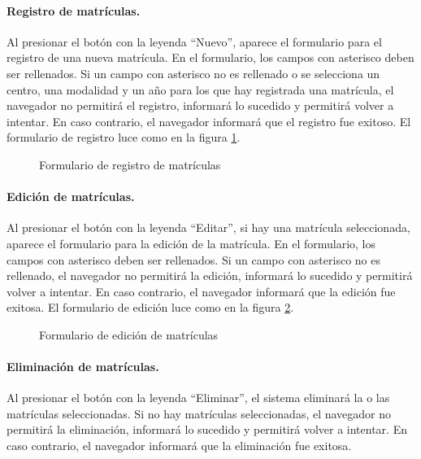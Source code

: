 \documentclass[a4paper, 9pt, conference]{article}              %
\begin{document}
\paragraph{Registro de matr\'iculas.}

Al presionar el bot\'on con la leyenda ``Nuevo'', aparece el formulario para el registro de una nueva matr\'icula. En el formulario, los campos con asterisco deben ser rellenados. Si un campo con asterisco no es rellenado o se selecciona un centro, una modalidad y un a\~no para los que hay registrada una matr\'icula, el navegador no permitir\'a el registro, informar\'a lo sucedido y permitir\'a volver a intentar. En caso contrario, el navegador informar\'a que el registro fue exitoso. El formulario de registro luce como en la figura \ref{fig:geoenrollmentsnew}.

\begin{figure}
	\centering
		\caption{Formulario de registro de matr\'iculas}
	\label{fig:geoenrollmentsnew}
\end{figure}

\paragraph{Edici\'on de matr\'iculas.}

Al presionar el bot\'on con la leyenda ``Editar'', si hay una matr\'icula seleccionada, aparece el formulario para la edici\'on de la matr\'icula. En el formulario, los campos con asterisco deben ser rellenados. Si un campo con asterisco no es rellenado, el navegador no permitir\'a la edici\'on, informar\'a lo sucedido y permitir\'a volver a intentar. En caso contrario, el navegador informar\'a que la edici\'on fue exitosa. El formulario de edici\'on luce como en la figura \ref{fig:geoenrollmentsedit}.

\begin{figure}
	\centering
		\caption{Formulario de edici\'on de matr\'iculas}
	\label{fig:geoenrollmentsedit}
\end{figure}

\paragraph{Eliminaci\'on de matr\'iculas.}

Al presionar el bot\'on con la leyenda ``Eliminar'', el sistema eliminar\'a la o las matr\'iculas seleccionadas. Si no hay matr\'iculas seleccionadas, el navegador no permitir\'a la eliminaci\'on, informar\'a lo sucedido y permitir\'a volver a intentar. En caso contrario, el navegador informar\'a que la eliminaci\'on fue exitosa.
\end{document}
